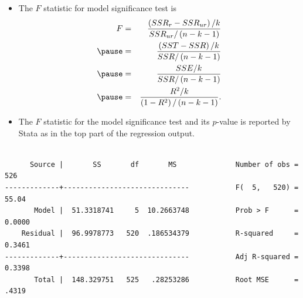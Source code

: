 \documentclass[notes=show,compress,beamer]{beamer}
\begin{document}
\begin{frame}%


\begin{itemize}
\item The $F$ statistic for model significance test is%
\begin{eqnarray*}
F &=&\frac{\left( SSR_{r}-SSR_{ur}\right) /k}{SSR_{ur}/\left( n-k-1\right) }
\\
\pause
&=&\frac{\left( SST-SSR\right) /k}{SSR/\left( n-k-1\right) } \\
\pause
&=&\frac{SSE/k}{SSR/\left( n-k-1\right) } \\
\pause
&=&\frac{R^{2}/k}{\left( 1-R^{2}\right) /\left( n-k-1\right) }.
\end{eqnarray*}
\end{itemize}

\end{frame}%

\begin{frame}[fragile=singleslide,shrink=30]%


\begin{itemize}
\item The $F$ statistic for the model significance test and its $p$-value is
reported by Stata as in the top part of the regression output.\medskip
\end{itemize}

\begin{verbatim}
 
      Source |       SS       df       MS              Number of obs =     526
-------------+------------------------------           F(  5,   520) =   55.04
       Model |  51.3318741     5  10.2663748           Prob > F      =  0.0000
    Residual |  96.9978773   520  .186534379           R-squared     =  0.3461
-------------+------------------------------           Adj R-squared =  0.3398
       Total |  148.329751   525   .28253286           Root MSE      =   .4319
 
\end{verbatim}

\end{frame}%
\end{document}
